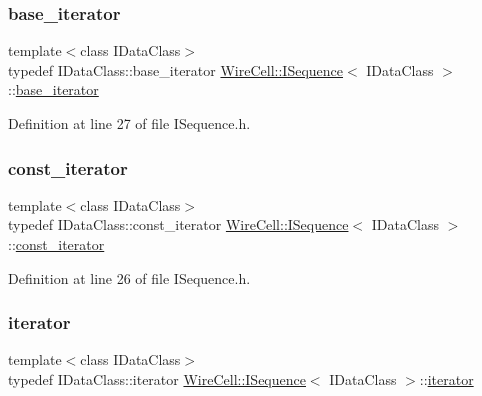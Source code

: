 \subsubsection{\texorpdfstring{base\+\_\+iterator}{base\_iterator}}
{\footnotesize\ttfamily template$<$class I\+Data\+Class$>$ \\
typedef I\+Data\+Class\+::base\+\_\+iterator \hyperlink{class_wire_cell_1_1_i_sequence}{Wire\+Cell\+::\+I\+Sequence}$<$ I\+Data\+Class $>$\+::\hyperlink{class_wire_cell_1_1_i_sequence_af99d3e9815ec440bd96ca06a6e65f26c}{base\+\_\+iterator}}



Definition at line 27 of file I\+Sequence.\+h.

\mbox{\label{class_wire_cell_1_1_i_sequence_a70e983c18db65df4337838592fa9fd9d}} 
\subsubsection{\texorpdfstring{const\+\_\+iterator}{const\_iterator}}
{\footnotesize\ttfamily template$<$class I\+Data\+Class$>$ \\
typedef I\+Data\+Class\+::const\+\_\+iterator \hyperlink{class_wire_cell_1_1_i_sequence}{Wire\+Cell\+::\+I\+Sequence}$<$ I\+Data\+Class $>$\+::\hyperlink{class_wire_cell_1_1_i_sequence_a70e983c18db65df4337838592fa9fd9d}{const\+\_\+iterator}}



Definition at line 26 of file I\+Sequence.\+h.

\mbox{\label{class_wire_cell_1_1_i_sequence_ac9bcf643972944d21c90743d9281f47a}} 
\subsubsection{\texorpdfstring{iterator}{iterator}}
{\footnotesize\ttfamily template$<$class I\+Data\+Class$>$ \\
typedef I\+Data\+Class\+::iterator \hyperlink{class_wire_cell_1_1_i_sequence}{Wire\+Cell\+::\+I\+Sequence}$<$ I\+Data\+Class $>$\+::\hyperlink{class_wire_cell_1_1_i_sequence_ac9bcf643972944d21c90743d9281f47a}{iterator}}



